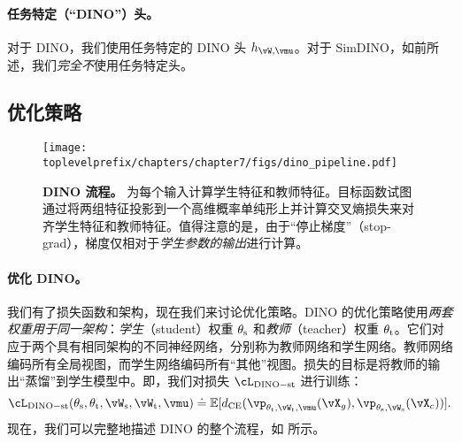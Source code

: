 \documentclass[../../book-main.tex]{subfiles}
\begin{document}
\paragraph{任务特定（“DINO”）头。} 对于 DINO，我们使用任务特定的 DINO 头 \(h_{\vW, \vmu}\)。对于 SimDINO，如前所述，我们\textit{完全不}使用任务特定头。

\subsection{优化策略}\label{sub:contrastive_learning_optimization}

\begin{figure}
    \centering 
    \texttt{[image: \\toplevelprefix/chapters/chapter7/figs/dino\_pipeline.pdf]}
    \caption{\small \textbf{DINO 流程。} 为每个输入计算学生特征和教师特征。目标函数试图通过将两组特征投影到一个高维概率单纯形上并计算交叉熵损失来对齐学生特征和教师特征。值得注意的是，由于“停止梯度”（stop-grad），梯度仅相对于\textit{学生参数的输出}进行计算。}
    \label{fig:dino_pipeline}
\end{figure}

\paragraph{优化 DINO。} 我们有了损失函数和架构，现在我们来讨论优化策略。DINO 的优化策略使用\textit{两套权重用于同一架构}：\textit{学生}（student）权重 \(\theta_{\mathrm{s}}\) 和\textit{教师}（teacher）权重 \(\theta_{\mathrm{t}}\)。它们对应于两个具有相同架构的不同神经网络，分别称为教师网络和学生网络。教师网络编码所有全局视图，而学生网络编码所有“其他”视图。损失的目标是将教师的输出“蒸馏”到学生模型中。即，我们对损失 \(\cL_{\dino{}-\student\teacher}\) 进行训练：
\begin{equation}\label{eq:dino_loss_teacherstudent}
    \cL_{\dino{}-\student\teacher}(\theta_{\student}, \theta_{\teacher}, \vW_{\student}, \vW_{\teacher}, \vmu) \doteq \Ex[d_{\CE}(\vp_{\theta_{\teacher}, \vW_{\teacher}, \vmu}(\vX_{g}), \vp_{\theta_{\student}, \vW_{\student}}(\vX_{c}))].
\end{equation}
现在，我们可以完整地描述 DINO 的整个流程，如  所示。
\end{document}
